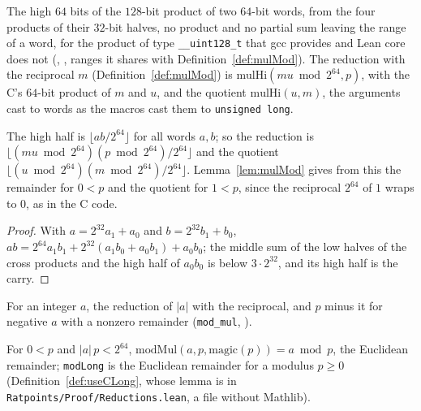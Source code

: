 \begin{definition}\label{def:mulHi}
  \leanok
  The high $64$ bits of the $128$-bit product of two $64$-bit words, from the four products of their
  $32$-bit halves, no product and no partial sum leaving the range of a word, for the product of
  type \verb|__uint128_t| that gcc provides and Lean core does not
  (, , ranges it shares with
  Definition~\ref{def:mulMod}). The reduction with the reciprocal $m$ (Definition~\ref{def:mulMod})
  is $\mathrm{mulHi}(m u \bmod 2^{64}, p)$, with the C's $64$-bit product of $m$ and $u$, and the
  quotient $\mathrm{mulHi}(u, m)$, the arguments cast to words as the macros cast them to
  \verb|unsigned long|.
\end{definition}

\begin{lemma}\label{lem:mulHi}
  \leanok
  The high half is $\lfloor a b / 2^{64} \rfloor$ for all words $a, b$; so the reduction is
  $\lfloor (m u \bmod 2^{64}) (p \bmod 2^{64}) / 2^{64} \rfloor$ and the quotient
  $\lfloor (u \bmod 2^{64}) (m \bmod 2^{64}) / 2^{64} \rfloor$. Lemma~\ref{lem:mulMod} gives from
  this the remainder for $0 < p$ and the quotient for $1 < p$, since the reciprocal $2^{64}$ of $1$
  wraps to $0$, as in the C code.
\end{lemma}

\begin{proof}
  \leanok
  With $a = 2^{32} a_1 + a_0$ and $b = 2^{32} b_1 + b_0$,
  $a b = 2^{64} a_1 b_1 + 2^{32}(a_1 b_0 + a_0 b_1) + a_0 b_0$; the middle sum of the low halves of
  the cross products and the high half of $a_0 b_0$ is below $3 \cdot 2^{32}$, and its high half is
  the carry.
\end{proof}

\begin{definition}\label{def:modMul}
  \leanok
  For an integer $a$, the reduction of $|a|$ with the reciprocal, and $p$ minus it for negative $a$
  with a nonzero remainder (\verb|mod_mul|, ).
\end{definition}

\begin{lemma}\label{lem:modMul}
  \leanok
  For $0 < p$ and $|a|\, p < 2^{64}$,
  $\mathrm{modMul}(a, p, \mathrm{magic}(p)) = a \bmod p$, the Euclidean remainder; \verb|modLong| is
  the Euclidean remainder for a modulus $p \ge 0$ (Definition~\ref{def:useCLong}, whose lemma is in
  \verb|Ratpoints/Proof/Reductions.lean|, a file without Mathlib).
\end{lemma}

